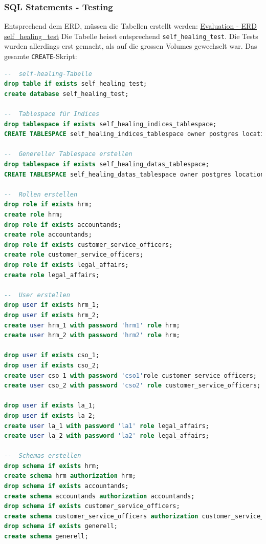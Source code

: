 \subsubsection{SQL Statements - Testing}
Entsprechend dem ERD, müssen die Tabellen erstellt werden:
\hyperref[subsubsec:erd_self_healing_test]{Evaluation - ERD self\_healing\_test}
Die Tabelle heisst entsprechend \texttt{self\_healing\_test}.
Die Tests wurden allerdings erst gemacht, als auf die grossen Volumes gewechselt war.
Das gesamte \texttt{CREATE}-Skript:
\lstset{style=gra_codestyle}
\begin{lstlisting}[language=sql, caption=Patroni - Self Healing Tests - CREATE-SQL,captionpos=b,label={lst:patroni-self-healing-create-sql},breaklines=true]
--  self-healing-Tabelle
drop table if exists self_healing_test;
create database self_healing_test;

--  Tablespace für Indices
drop tablespace if exists self_healing_indices_tablespace;
CREATE TABLESPACE self_healing_indices_tablespace owner postgres location '/srv/data/self_healing_test_index_tablespace';

--  Genereller Tablespace erstellen
drop tablespace if exists self_healing_datas_tablespace;
CREATE TABLESPACE self_healing_datas_tablespace owner postgres location '/srv/data/self_healing_test_data_tablespace';

--  Rollen erstellen
drop role if exists hrm;
create role hrm;
drop role if exists accountands;
create role accountands;
drop role if exists customer_service_officers;
create role customer_service_officers;
drop role if exists legal_affairs;
create role legal_affairs;

--  User erstellen
drop user if exists hrm_1;
drop user if exists hrm_2;
create user hrm_1 with password 'hrm1' role hrm;
create user hrm_2 with password 'hrm2' role hrm;

drop user if exists cso_1;
drop user if exists cso_2;
create user cso_1 with password 'cso1'role customer_service_officers;
create user cso_2 with password 'cso2' role customer_service_officers;

drop user if exists la_1;
drop user if exists la_2;
create user la_1 with password 'la1' role legal_affairs;
create user la_2 with password 'la2' role legal_affairs;

--  Schemas erstellen
drop schema if exists hrm;
create schema hrm authorization hrm;
drop schema if exists accountands;
create schema accountands authorization accountands;
drop schema if exists customer_service_officers;
create schema customer_service_officers authorization customer_service_officers;
drop schema if exists generell;
create schema generell;


\end{lstlisting}
